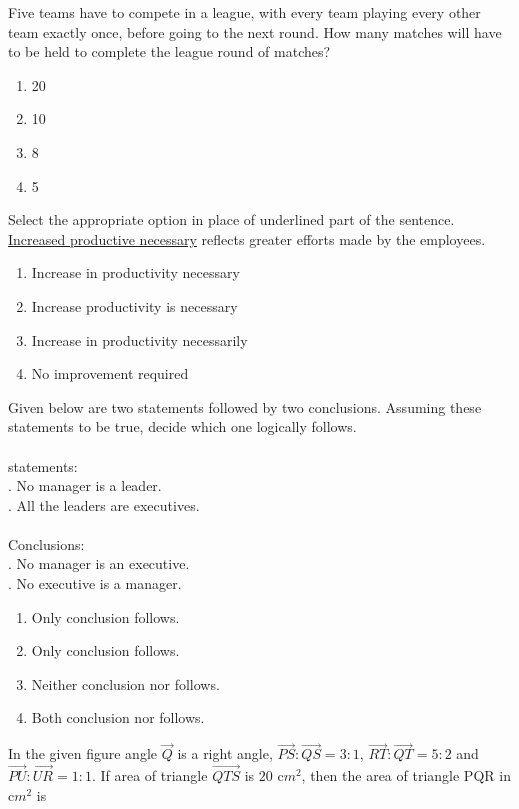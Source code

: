     \item Five teams have to compete in a league, with every team playing every other team exactly once, before going to the next round. How many matches will have to be held to complete the league round of matches?
    \begin{enumerate}
        \item 20
        \item 10
        \item 8
        \item 5
    \end{enumerate}
    \item Select the appropriate option in place of underlined part of the sentence.\\ \underline{Increased productive necessary} reflects greater efforts made by the employees.
    \begin{enumerate}
        \item Increase in productivity necessary
        \item Increase productivity is necessary
        \item Increase in productivity necessarily
        \item No improvement required
    \end{enumerate}
    \item Given below are two statements followed by two conclusions. Assuming these statements to be true, decide which one logically follows.\\\\
    statements:\\
    \uppercase{\expandafter{}}. No manager is a leader.\\
    \uppercase{\expandafter{}}. All the leaders are executives.\\\\
    Conclusions:\\
    \uppercase{\expandafter{}}. No manager is an executive.\\
    \uppercase{\expandafter{}}. No executive is a manager.\\
    \begin{enumerate}
        \item Only conclusion \uppercase{\expandafter{}} follows.
        \item Only conclusion \uppercase{\expandafter{}} follows.
        \item Neither conclusion \uppercase{\expandafter{}} nor \uppercase{\expandafter{}} follows.
        \item Both conclusion \uppercase{\expandafter{}} nor \uppercase{\expandafter{}} follows.
    \end{enumerate}
    \item In the given figure angle $\vec{Q}$ is a right angle, $\vec{PS}:\vec{QS}=3:1$, $\vec{RT}:\vec{QT}=5:2$ and $\vec{PU}:\vec{UR}=1:1$. If area of triangle $\vec{QTS}$ is $20$ c$m^2$, then the area of triangle PQR in c$m^2$ is \underline{\phantom{black}}



